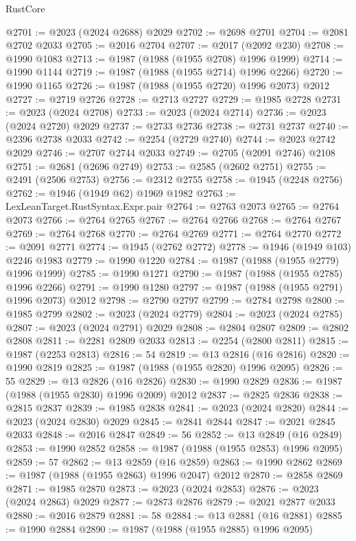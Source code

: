 \begin{lexlean}{RustCore}
\begin{coremodule}
@2701 := @2023 (@2024 @2688) @2029
@2702 := @2698 @2701
@2704 := @2081 @2702 @2033
@2705 := @2016 @2704
@2707 := @2017 (@2092 @230)
@2708 := @1990 @1083
@2713 := @1987 (@1988 (@1955 @2708) @1996 @1999)
@2714 := @1990 @1144
@2719 := @1987 (@1988 (@1955 @2714) @1996 @2266)
@2720 := @1990 @1165
@2726 := @1987 (@1988 (@1955 @2720) @1996 @2073) @2012
@2727 := @2719 @2726
@2728 := @2713 @2727
@2729 := @1985 @2728
@2731 := @2023 (@2024 @2708)
@2733 := @2023 (@2024 @2714)
@2736 := @2023 (@2024 @2720) @2029
@2737 := @2733 @2736
@2738 := @2731 @2737
@2740 := @2396 @2738 @2033
@2742 := @2254 (@2729 @2740)
@2744 := @2023 @2742 @2029
@2746 := @2707 @2744 @2033
@2749 := @2705 (@2091 @2746) @2108
@2751 := @2681 (@2696 @2749)
@2753 := @2585 (@2602 @2751)
@2755 := @2491 (@2506 @2753)
@2756 := @2312 @2755
@2758 := @1945 (@2248 @2756)
@2762 := @1946 (@1949 @62) @1969 @1982
@2763 := LexLeanTarget.RustSyntax.Expr.pair
@2764 := @2763 @2073
@2765 := @2764 @2073
@2766 := @2764 @2765
@2767 := @2764 @2766
@2768 := @2764 @2767
@2769 := @2764 @2768
@2770 := @2764 @2769
@2771 := @2764 @2770
@2772 := @2091 @2771
@2774 := @1945 (@2762 @2772)
@2778 := @1946 (@1949 @103) @2246 @1983
@2779 := @1990 @1220
@2784 := @1987 (@1988 (@1955 @2779) @1996 @1999)
@2785 := @1990 @1271
@2790 := @1987 (@1988 (@1955 @2785) @1996 @2266)
@2791 := @1990 @1280
@2797 := @1987 (@1988 (@1955 @2791) @1996 @2073) @2012
@2798 := @2790 @2797
@2799 := @2784 @2798
@2800 := @1985 @2799
@2802 := @2023 (@2024 @2779)
@2804 := @2023 (@2024 @2785)
@2807 := @2023 (@2024 @2791) @2029
@2808 := @2804 @2807
@2809 := @2802 @2808
@2811 := @2281 @2809 @2033
@2813 := @2254 (@2800 @2811)
@2815 := @1987 (@2253 @2813)
@2816 := 54
@2819 := @13 @2816 (@16 @2816)
@2820 := @1990 @2819
@2825 := @1987 (@1988 (@1955 @2820) @1996 @2095)
@2826 := 55
@2829 := @13 @2826 (@16 @2826)
@2830 := @1990 @2829
@2836 := @1987 (@1988 (@1955 @2830) @1996 @2009) @2012
@2837 := @2825 @2836
@2838 := @2815 @2837
@2839 := @1985 @2838
@2841 := @2023 (@2024 @2820)
@2844 := @2023 (@2024 @2830) @2029
@2845 := @2841 @2844
@2847 := @2021 @2845 @2033
@2848 := @2016 @2847
@2849 := 56
@2852 := @13 @2849 (@16 @2849)
@2853 := @1990 @2852
@2858 := @1987 (@1988 (@1955 @2853) @1996 @2095)
@2859 := 57
@2862 := @13 @2859 (@16 @2859)
@2863 := @1990 @2862
@2869 := @1987 (@1988 (@1955 @2863) @1996 @2047) @2012
@2870 := @2858 @2869
@2871 := @1985 @2870
@2873 := @2023 (@2024 @2853)
@2876 := @2023 (@2024 @2863) @2029
@2877 := @2873 @2876
@2879 := @2021 @2877 @2033
@2880 := @2016 @2879
@2881 := 58
@2884 := @13 @2881 (@16 @2881)
@2885 := @1990 @2884
@2890 := @1987 (@1988 (@1955 @2885) @1996 @2095)

\end{coremodule}
\end{lexlean}
